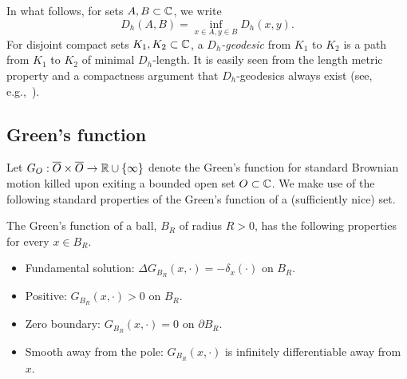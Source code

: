 \documentclass[12pt]{amsart}
\numberwithin{equation}{section}
\begin{document}
	
	In what follows, for sets $A,B\subset \mathbb{C}$, we write
	\begin{equation} \label{eq:set-dist}
	D_h(A,B) = \inf_{x\in A, y\in B} D_h(x,y) .
	\end{equation} 
	For disjoint compact sets $K_1,K_2\subset \mathbb{C}$, a \emph{$D_h$-geodesic} from $K_1$ to $K_2$ is a path from $K_1$ to $K_2$ of minimal $D_h$-length. It is easily seen from the length metric property and a compactness argument that $D_h$-geodesics always exist (see, e.g.,~\cite[Corollary 2.5.20]{bbi-metric-geometry}). 
	
	
	
	
	
	\subsection{Green's function} \label{subsec:green}
	Let $G_{O}:\overline{O} \times \overline{O} \to \mathbb{R} \cup \{\infty\}$ denote the Green's function for standard Brownian motion killed upon exiting a bounded open set $O \subset \mathbb{C}$. 
	We make use of the following standard properties of the Green's function of a (sufficiently nice) set. 
	\begin{prop} \label{prop:green-properties}
		The Green's function of a ball, $B_R$ of radius $R > 0$, has the following properties for every $x \in B_R$.
		\begin{itemize}
			\item Fundamental solution: $\Delta G_{B_R}(x,\cdot) = -\delta_x(\cdot)$ on $B_R$.
			\item Positive: $G_{B_R}(x, \cdot) > 0$ on $B_R$.
			\item Zero boundary: $G_{B_R}(x, \cdot) = 0$ on $\partial B_R$.
			\item Smooth away from the pole: $G_{B_R}(x, \cdot)$ is infinitely differentiable away from $x$. 
		\end{itemize}
	\end{prop}
	
\end{document}
